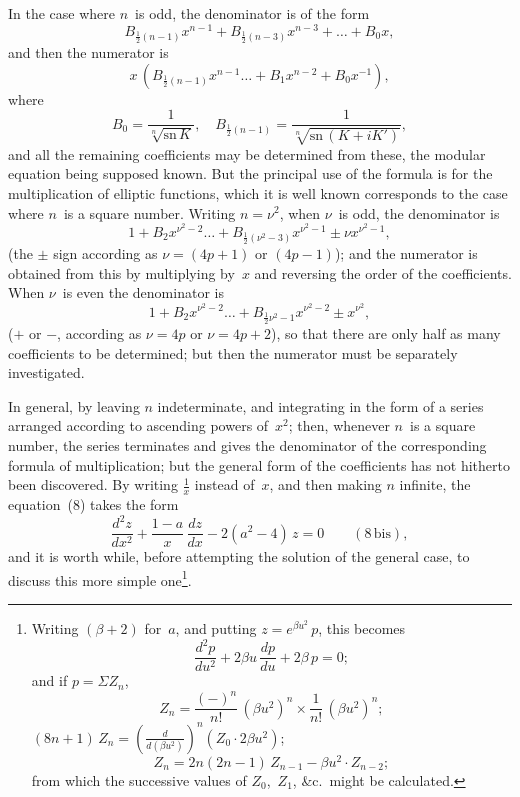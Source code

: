 \documentclass[11pt,a4paper]{article}
\newcommand{\sno}{\mathrm{sn}}
\begin{document}
In the case where $n$~is odd, the denominator is of the form
\[
B_{\frac{1}{2}(n-1)} x^{n-1} + B_{\frac{1}{2}(n-3)} x^{n-3} + \ldots + B_0 x,
\]
and then the numerator is
\[
x\,(B_{\frac{1}{2}(n-1)} x^{n-1} \ldots + B_1 x^{n-2} + B_0 x^{-1}),
\]
where
\[
B_0 = \frac{1}{\sqrt[n]{\sno\,K}}, \quad B_{\frac{1}{2}(n-1)} = \frac{1}{\sqrt[n]{\sno\,(K+iK')}},
\]
and all the remaining coefficients may be determined from these, the modular equation being supposed known. But the principal use of the formula is for the multiplication of elliptic functions, which it is well known corresponds to the case where $n$~is a square number. Writing $n = \nu^2$, when $\nu$~is odd, the denominator is
\[
1 + B_2 x^{\nu^2-2} \ldots + B_{\frac{1}{2}(\nu^2-3)} x^{\nu^2-1} \pm \nu x^{\nu^2-1},
\]
(the $\pm$ sign according as $\nu = (4p+1)$ or $(4p-1)$); and the numerator is obtained from this by multiplying by~$x$ and reversing the order of the coefficients. When $\nu$~is even the denominator is
\[
1 + B_2 x^{\nu^2-2} \ldots + B_{\frac{1}{2}\nu^2-1} x^{\nu^2-2} \pm x^{\nu^2},
\]
($+$ or $-$, according as $\nu = 4p$ or $\nu = 4p+2$), so that there are only half as many coefficients to be determined; but then the numerator must be separately investigated.

\newpage
In general, by leaving $n$ indeterminate, and integrating in the form of a series arranged according to ascending powers of~$x^2$; then, whenever $n$~is a square number, the series terminates and gives the denominator of the corresponding formula of multiplication; but the general form of the coefficients has not hitherto been discovered. By writing $\frac{1}{x}$ instead of~$x$, and then making $n$ infinite, the equation~(8) takes the form
\[
\frac{d^2z}{dx^2} + \frac{1-a}{x}\,\frac{dz}{dx} - 2(a^2-4)\,z = 0 \qquad(8\,\text{bis}),
\]
and it is worth while, before attempting the solution of the general case, to discuss this more simple one\footnote{Writing $(\beta+2)$ for~$a$, and putting $z = e^{\beta u^2}\,p$, this becomes
\[
\frac{d^2p}{du^2} + 2\beta u\,\frac{dp}{du} + 2\beta\,p = 0;
\]
and if $p = \Sigma Z_n$,
\[
Z_n = \frac{(-)^n}{n!}\,(\beta u^2)^n \times \frac{1}{n!}\,(\beta u^2)^n;
\]
$(8n+1)\,Z_n = \left(\frac{d}{d(\beta u^2)}\right)^n (Z_0 \cdot 2\beta u^2)$;
\[
Z_n = 2n(2n-1)\,Z_{n-1} - \beta u^2 \cdot Z_{n-2};
\]
from which the successive values of $Z_0$,~$Z_1$, \&c.\ might be calculated.}.
\end{document}
